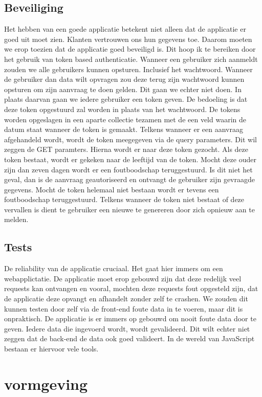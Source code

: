\documentclass[a4paper,11pt]{article}
\begin{document}
\subsection{Beveiliging}
Het hebben van een goede applicatie betekent niet alleen dat de applicatie er goed uit moet zien. Klanten vertrouwen ons hun gegevens toe. Daarom moeten we erop toezien dat de applicatie goed beveiligd is. Dit hoop ik te bereiken door het gebruik van token based authenticatie. Wanneer een gebruiker zich aanmeldt zouden we alle gebruikers kunnen opsturen. Inclusief het wachtwoord. Wanneer de gebruiker dan data wilt opvragen zou deze terug zijn wachtwoord kunnen opsturen om zijn aanvraag te doen gelden. Dit gaan we echter niet doen. In plaats daarvan gaan we iedere gebruiker een token geven. De bedoeling is dat deze token opgestuurd zal worden in plaats van het wachtwoord. De tokens worden opgeslagen in een aparte collectie tezamen met de een veld waarin de datum staat wanneer de token is gemaakt. Telkens wanneer er een aanvraag afgehandeld wordt, wordt de token meegegeven via de query parameters. Dit wil zeggen de GET paramters. Hierna wordt er naar deze token gezocht. Als deze token bestaat, wordt er gekeken naar de leeftijd van de token. Mocht deze ouder zijn dan zeven dagen wordt er een foutboodschap teruggestuurd. Is dit niet het geval, dan is de aanvraag geautoriseerd en ontvangt de gebruiker zijn gevraagde gegevens. Mocht de token helemaal niet bestaan wordt er tevens een foutboodschap teruggestuurd. Telkens wanneer de token niet bestaat of deze vervallen is dient te gebruiker een nieuwe te genereren door zich opnieuw aan te melden.

\subsection{Tests}
De reliability van de applicatie cruciaal. Het gaat hier immers om een webapplictatie. De applicatie moet erop gebouwd zijn dat deze redelijk veel requests kan ontvangen en vooral, mochten deze requests fout opgesteld zijn, dat de applicatie deze opvangt en afhandelt zonder zelf te crashen. We zouden dit kunnen testen door zelf via de front-end foute data in te voeren, maar dit is onpraktisch. De applicatie is er immers op gebouwd om nooit foute data door te geven. Iedere data die ingevoerd wordt, wordt gevalideerd. Dit wilt echter niet zeggen dat de back-end de data ook goed valideert. In de wereld van JavaScript bestaan er hiervoor vele tools.

\section{vormgeving}
\end{document}
